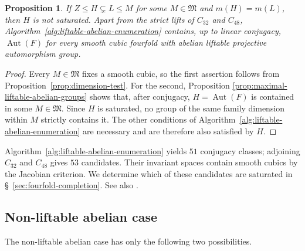 \documentclass[12pt]{amsart}
\numberwithin{equation}{section}
\theoremstyle{plain}
\newtheorem{prop}[thm]{Proposition}
\theoremstyle{definition}
\theoremstyle{remark}
\DeclareMathOperator{\Aut}{Aut}
\begin{document}
\begin{prop}\label{prop:liftable-abelian-completeness}
If $Z\leq H\subsetneq L\leq M$ for some $M\in\mathfrak M$ and $m(H)=m(L)$,
then $H$ is not saturated.  Apart from the strict lifts of $C_{32}$ and
$C_{48}$, Algorithm~\ref{alg:liftable-abelian-enumeration} contains, up to
linear conjugacy, $\Aut(F)$ for every smooth cubic fourfold with abelian
liftable projective automorphism group.
\end{prop}

\begin{proof}
Every $M\in\mathfrak M$ fixes a smooth cubic, so the first assertion follows
from Proposition~\ref{prop:dimension-test}.  For the second, Proposition
\ref{prop:maximal-liftable-abelian-groups} shows that, after conjugacy,
$H=\Aut(F)$ is contained in some $M\in\mathfrak M$. Since $H$ is
saturated, no group of the same family dimension within $M$ strictly
contains it. The other conditions of
Algorithm~\ref{alg:liftable-abelian-enumeration} are necessary and are
therefore also satisfied by $H$.
\end{proof}

Algorithm~\ref{alg:liftable-abelian-enumeration} yields $51$
conjugacy classes; adjoining $C_{32}$ and $C_{48}$ gives $53$ candidates.
Their invariant spaces contain smooth cubics by the Jacobian
criterion. We determine which of these candidates are saturated in \S~\ref{sec:fourfold-completion}.
See also .

\subsection{Non-liftable abelian case}

The non-liftable abelian case has only the following two possibilities.
\end{document}
